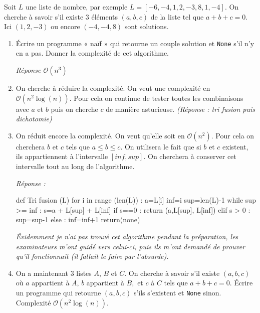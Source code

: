 \documentclass[10pt,fleqn]{article} %
\begin{document}
\begin{multicols}{2}
Soit $L$ une liste de nombre, par exemple $L= [-6,-4,1,2,-3,8,1,-4]$. 
On cherche à savoir s’il existe 3 éléments $(a,b,c)$ de la liste tel que $a+b+c=0$.
Ici $(1,2,-3)$ ou encore $(-4,-4,8)$ sont solutions.

\begin{enumerate}
\item Écrire un programme « naïf » qui retourne un couple solution et \texttt{None} s’il n’y en a pas. 
Donner la complexité de cet algorithme.

\textit{Réponse $\mathcal{O}(n^3)$}

\item On cherche à réduire la complexité. On veut une complexité en $\mathcal{O}\left(n^2\log(n)\right)$. Pour cela on continue de tester toutes les combinaisons avec $a$ et $b$ puis on cherche $c$ de manière astucieuse. \textit{(Réponse : tri fusion puis dichotomie) }
\item On réduit encore la complexité. On veut qu’elle soit en $\mathcal{O}(n^2)$. 
Pour cela on cherchera $b$ et $c$ tels que $a\leq b\leq c$. On utilisera le fait que si $b$ et $c$ existent, ils appartiennent à l’intervalle $[inf,sup]$. On cherchera à conserver cet intervalle tout au long de l’algorithme. 

\textit{Réponse :}
\begin{python}
def Tri fusion (L)
    for i in range (len(L)) :
        a=L[i]
        inf=i
        sup=len(L)-1
        while sup >= inf :
            s=a + L[sup] + L[inf]
            if s==0 :
                return (a,L[sup], L[inf]) 
            elif s > 0 :
                sup=sup-1
            else :
                inf=inf+1
    return(none)
\end{python}
\textit{Évidemment je n’ai pas trouvé cet algorithme pendant la préparation, les examinateurs m’ont guidé vers celui-ci, puis ils m’ont demandé de prouver qu’il fonctionnait (il fallait le faire par l’absurde).} 

\item On a maintenant 3 listes $A$, $B$ et $C$. On cherche à savoir s’il existe $(a,b,c)$ où $a$ appartient à $A$, $b$ appartient à $B,$ et $c$ à $C$ tels que $a+b+c=0$.
Écrire un programme qui retourne $(a,b,c)$ s’ils s’existent et \texttt{None} sinon. Complexité $\mathcal{O}(n^2\log (n))$. 



\end{enumerate}
\end{multicols}
\end{document}
